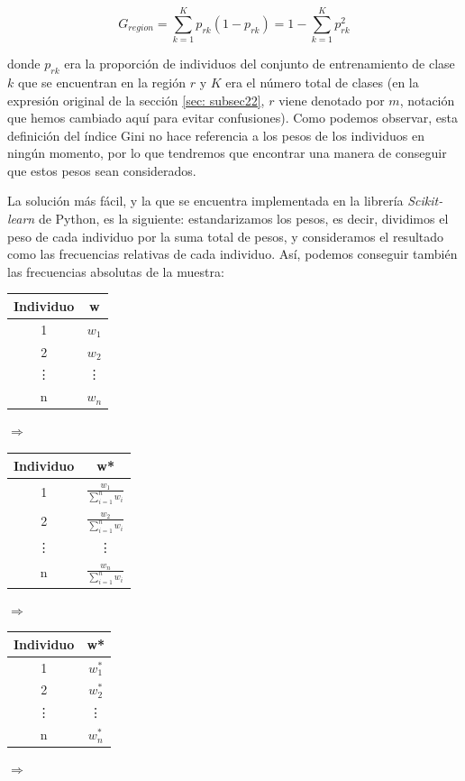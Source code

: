 \documentclass[12pt,twoside]{article}
\begin{document}
\begin{equation*}
G_{region} = \sum_{k=1}^K p_{rk}(1 - p_{rk}) = 1 - \sum_{k=1}^K p_{rk}^2
\end{equation*}

\noindent
donde $p_{rk}$ era la proporción de individuos del conjunto de entrenamiento de clase $k$ que se encuentran en la región $r$ y $K$ era el número total de clases (en la expresión original de la sección \ref{sec: subsec22}, $r$ viene denotado por $m$, notación que hemos cambiado aquí para evitar confusiones). Como podemos observar, esta definición del índice Gini no hace referencia a los pesos de los individuos en ningún momento, por lo que tendremos que encontrar una manera de conseguir que estos pesos sean considerados.

La solución más fácil, y la que se encuentra implementada en la librería \emph{Scikit-learn} de Python, es la siguiente: estandarizamos los pesos, es decir, dividimos el peso de cada individuo por la suma total de pesos, y consideramos el resultado como las frecuencias relativas de cada individuo. Así, podemos conseguir también las frecuencias absolutas de la muestra:
\begin{table}[h]
\centering
\begin{tabular}{|c|c|}
\hline
Individuo & w \\ \hline
1 & $w_1$ \\ \hline
2 & $w_2$ \\ \hline
\vdots & \vdots \\ \hline
n & $w_n$ \\ \hline
\end{tabular}
$\Rightarrow$
\begin{tabular}{|c|c|}
\hline
Individuo & w* \\ \hline
1 & $\frac{w_1}{\sum_{i=1}^n w_i}$ \\ \hline
2 & $\frac{w_2}{\sum_{i=1}^n w_i}$ \\ \hline
\vdots & \vdots \\ \hline
n & $\frac{w_n}{\sum_{i=1}^n w_i}$ \\ \hline
\end{tabular}
$\Rightarrow$
\begin{tabular}{|c|c|}
\hline
Individuo & w* \\ \hline
1 & $w_1^*$ \\ \hline
2 & $w_2^*$ \\ \hline
\vdots & \vdots \\ \hline
n & $w_n^*$ \\ \hline
\end{tabular}
$\Rightarrow$
\end{table}
\end{document}
